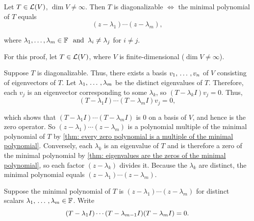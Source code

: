 \setcounter{thm}{61}
\begin{thm}
  \label{thm: necessary and sufficient condition for diagonalizability}
  Let $T\in \mathcal{L} (V)$, $\dim V \neq \infty$. Then $T$ is diagonalizable $\iff$ the minimal polynomial of $T$ equals
  \begin{equation}
    (z-\lambda_1) \cdots (z-\lambda_m),
  \end{equation}

  where $\lambda_1, \dots, \lambda_m \in \mathbb{F} \;\;\, \text{and}\;\; \lambda_i \neq  \lambda_j $ for $ i \neq j$.
\end{thm}
\begin{prf} For this proof, let $T\in \mathcal{L} (V)$, where $V$ is finite-dimensional ($\dim V \neq \infty$).

  \Rightarrowdirection Suppose $T$ is diagonalizable. Thus, there exists a basis $v_1, {\, \ldots \,\,}, v_n$ of $V$ consisting of eigenvectors of $T$. Let $\lambda_1, {\, \ldots \,\,}, \lambda_m$ be the distinct eigenvalues of $T$. Therefore, each $v_j$ is an eigenvector corresponding to some $\lambda_k$, so $(T-\lambda_k I)v_j = 0.$
  Thus,
  \begin{equation}
    (T-\lambda_1 I) \cdots (T-\lambda_m I)v_j =0,
  \end{equation}

  which shows that $(T-\lambda_1 I) \cdots (T-\lambda_m I)$ is $0$ on a basis of $V$, and hence is the zero operator. So $(z-\lambda_1)\cdots(z-\lambda_m)$ is a polynomial multiple of the minimal polynomial of $T$ by \ref{thm: every zero polynomial is a multiple of the minimal polynomial}. Conversely, each $\lambda_k$ is an eigenvalue of $T$ and is therefore a zero of the minimal polynomial by \ref{thm: eigenvalues are the zeros of the minimal polynomial}, so each factor $(z-\lambda_k)$ divides it. Because the $\lambda_k$ are distinct, the minimal polynomial equals $(z-\lambda_1)\cdots(z-\lambda_m)$.

  \Leftarrowdirection Suppose the minimal polynomial of $T$ is $(z-\lambda_1) \cdots (z-\lambda_m)$ for distinct scalars $\lambda_1, {\, \ldots \,\,}, \lambda_m \in \mathbb{F}$.
  Write
  \begin{equation}
    \label{eq: (t-l1 I)***(t-l_{m}I)=0}
    (T-\lambda_1 I) \cdots (T-\lambda_{m-1} I) (T-\lambda_m I)=0.
  \end{equation}

%


\end{prf}
